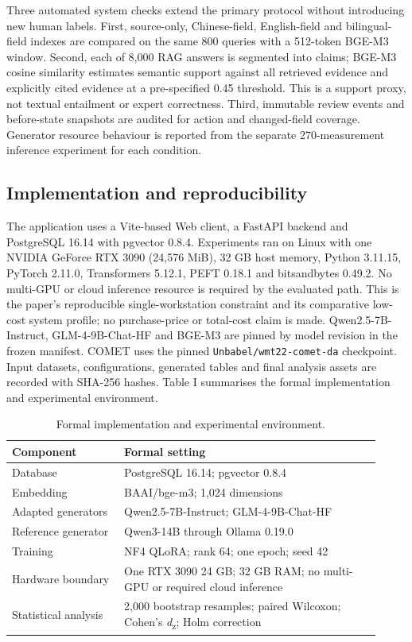 Three automated system checks extend the primary protocol without introducing new human labels. First, source-only, Chinese-field, English-field and bilingual-field indexes are compared on the same 800 queries with a 512-token BGE-M3 window. Second, each of 8,000 RAG answers is segmented into claims; BGE-M3 cosine similarity estimates semantic support against all retrieved evidence and explicitly cited evidence at a pre-specified 0.45 threshold. This is a support proxy, not textual entailment or expert correctness. Third, immutable review events and before-state snapshots are audited for action and changed-field coverage. Generator resource behaviour is reported from the separate 270-measurement inference experiment for each condition.

\subsection{Implementation and reproducibility}

The application uses a Vite-based Web client, a FastAPI backend and PostgreSQL 16.14 with pgvector 0.8.4. Experiments ran on Linux with one NVIDIA GeForce RTX 3090 (24,576 MiB), 32 GB host memory, Python 3.11.15, PyTorch 2.11.0, Transformers 5.12.1, PEFT 0.18.1 and bitsandbytes 0.49.2. No multi-GPU or cloud inference resource is required by the evaluated path. This is the paper's reproducible single-workstation constraint and its comparative low-cost system profile; no purchase-price or total-cost claim is made. Qwen2.5-7B-Instruct, GLM-4-9B-Chat-HF and BGE-M3 are pinned by model revision in the frozen manifest. COMET uses the pinned \texttt{Unbabel/wmt22-comet-da} checkpoint. Input datasets, configurations, generated tables and final analysis assets are recorded with SHA-256 hashes. Table I summarises the formal implementation and experimental environment.

\begin{table}[ht]
\centering
\caption{Formal implementation and experimental environment.}

\begin{tabular}{p{0.28\linewidth}p{0.64\linewidth}}
\toprule
Component & Formal setting \\
\midrule
Database & PostgreSQL 16.14; pgvector 0.8.4 \\
Embedding & BAAI/bge-m3; 1,024 dimensions \\
Adapted generators & Qwen2.5-7B-Instruct; GLM-4-9B-Chat-HF \\
Reference generator & Qwen3-14B through Ollama 0.19.0 \\
Training & NF4 QLoRA; rank 64; one epoch; seed 42 \\
Hardware boundary & One RTX 3090 24 GB; 32 GB RAM; no multi-GPU or required cloud inference \\
Statistical analysis & 2,000 bootstrap resamples; paired Wilcoxon; Cohen's \emph{d}\textsubscript{z}; Holm correction \\
\bottomrule
\end{tabular}
\end{table}


